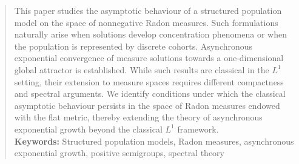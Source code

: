 \documentclass[12pt,a4paper]{amsart}
\begin{document}
\fi
\date{}

\begin{abstract}
This paper studies the asymptotic behaviour of a structured population model on the space of nonnegative Radon measures. Such formulations naturally arise when solutions develop concentration phenomena or when the population is represented by discrete cohorts. Asynchronous exponential convergence of measure solutions towards a one-dimensional global attractor is established. While such results are classical in the $L^1$ setting, their extension to measure spaces requires different compactness and spectral arguments. We identify conditions under which the classical asymptotic behaviour persists in the space of Radon measures endowed with the flat metric, thereby extending the theory of asynchronous exponential growth beyond the classical $L^1$ framework.\\

\noindent\textbf{Keywords:}
Structured population models, Radon measures,
asynchronous exponential growth,
positive semigroups,
spectral theory

\end{abstract}








\maketitle
\end{document}
